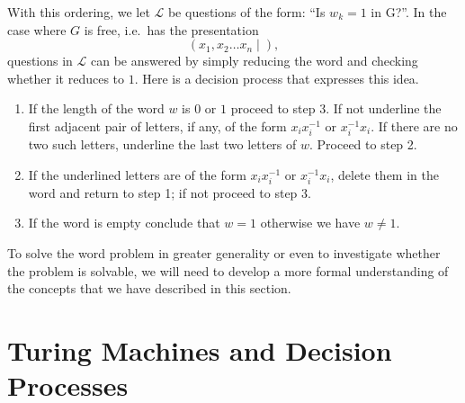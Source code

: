 \documentclass[12pt]{article}
\theoremstyle{definition}
\numberwithin{equation}{theorem}
\begin{document}
With this ordering, we let $\mathcal{L}$ be questions of the form: ``Is $w_k = 1$ in G?''. In the case where $G$ is free, i.e.\ has the presentation
\begin{equation*}
  (x_1,x_2 \dots x_n \mid ),
\end{equation*}
questions in $\mathcal{L}$ can be answered by simply reducing the word and checking whether it reduces to $1$. Here is a decision process that expresses this idea.

\begin{enumerate}
\item If the length of the word $w$ is $0$ or $1$ proceed to step 3. If not underline the first adjacent pair of letters, if any, of the form $x_ix_i^{-1}$ or $x_i^{-1}x_i$. If there are no two such letters, underline the last two letters of $w$. Proceed to step 2.
\item If the underlined letters are of the form $x_ix_i^{-1}$ or $x_i^{-1}x_i$, delete them in the word and return to step 1; if not proceed to step 3.
\item If the word is empty conclude that $w = 1$ otherwise we have $w \neq 1$.
\end{enumerate}

To solve the word problem in greater generality or even to investigate  whether the problem is solvable, we will need to develop a more formal understanding of the concepts that we have described in this section.

\section{Turing Machines and Decision Processes}
\end{document}
